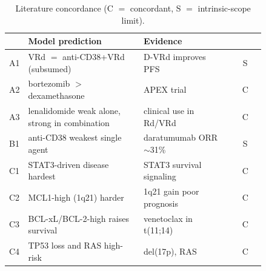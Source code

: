 \documentclass[conference,letterpaper]{IEEEtran}
\begin{document}
\begin{table}[t]
\centering
\scriptsize
\caption{Literature concordance (C $=$ concordant, S $=$ intrinsic-scope limit).}
\label{tab:concordance}
\setlength{\tabcolsep}{3pt}
\begin{tabular}{@{}p{0.04\linewidth} >{\raggedright\arraybackslash}p{0.45\linewidth} >{\raggedright\arraybackslash}p{0.35\linewidth} c@{}}
\toprule
 & Model prediction & Evidence & \\
\midrule
A1 & VRd $=$ anti-CD38+VRd (subsumed) & D-VRd improves PFS~\cite{perseus,castor,pollux} & S \\
A2 & bortezomib $>$ dexamethasone & APEX trial~\cite{apex} & C \\
A3 & lenalidomide weak alone, strong in combination & clinical use in Rd/VRd~\cite{perseus,relapse} & C \\
B1 & anti-CD38 weakest single agent & daratumumab ORR $\sim$31\%~\cite{gen501,sirius} & S \\
C1 & STAT3-driven disease hardest & STAT3 survival signaling~\cite{stat3,shaffer} & C \\
C2 & MCL1-high (1q21) harder & 1q21 gain poor prognosis~\cite{imwghr} & C \\
C3 & BCL-xL/BCL-2-high raises survival & venetoclax in t(11;14)~\cite{venetoclax} & C \\
C4 & TP53 loss and RAS high-risk & del(17p), RAS~\cite{imwghr} & C \\
\bottomrule
\end{tabular}
\end{table}
\end{document}
